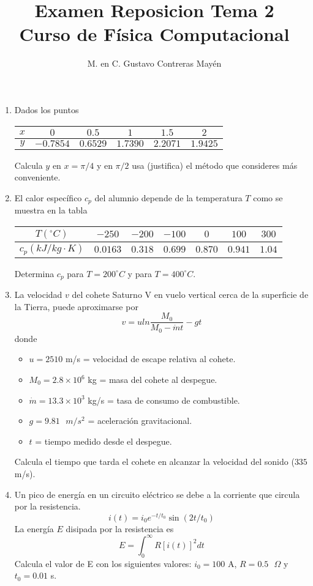 \documentclass[11pt]{article}
\title{Examen Reposicion Tema 2 \\ Curso de Física Computacional}
\author{M. en C. Gustavo Contreras May\'{e}n}
\date{ }
\begin{document}
\maketitle
\fontsize{14}{14}\selectfont
\begin{enumerate}
\item Dados los puntos
\begin{table}[H]
\centering 
\begin{large}
\begin{tabulary}{15cm}{c | c | c | c | c | c  }\normalsize
$x$ & $0$ & $0.5$ & $1$ & $1.5$ & $2$ \\
\midrule
$y$ & $-0.7854$ & $0.6529$ & $1.7390$ & $2.2071$ & $1.9425$
\end{tabulary}
\end{large}
\end{table}
Calcula $y$ en $x=\pi/4$ y en $\pi/2$ usa (justifica) el método que consideres más conveniente.
\item El calor específico $c_{p}$ del alumnio depende de la temperatura $T$ como se muestra en la tabla
\begin{table}[H]
\centering 
\begin{large}
\begin{tabulary}{15cm}{c | c | c | c | c | c | c }
$T (^{\circ}C)$ & $-250$ & $-200$ & $-100$ & $0$ & $100$ & $300$ \\
\midrule
$c_{p} (k J/kg \cdot K)$ & $0.0163$ & $0.318$ & $0.699$ & $0.870$ & $0.941$ & $1.04  $
\end{tabulary}
\end{large}	
\end{table}
Determina $c_{p}$ para $T=200^{\circ}C$ y para $T=400^{\circ}C$.
\item La velocidad $v$ del cohete Saturno V en vuelo vertical cerca de la superficie de la Tierra, puede aproximarse por
\[ v = u ln \dfrac{M_{0}}{M_{0}- \dot{m}t}- gt\]
donde
\begin{itemize}
\item $u=2510$ m/s = velocidad de escape relativa al cohete.
\item $M_{0}= 2.8 \times 10^{6}$ kg = masa del cohete al despegue.
\item $\dot{m}=13.3 \times 10^{3}$ kg/s = tasa de consumo de combustible.
\item $g=9.81 \mbox{ }m/s^{2}$ = aceleración gravitacional.
\item  $t$ = tiempo medido desde el despegue.
\end{itemize}
Calcula el tiempo que tarda el cohete en alcanzar la velocidad del sonido ($335$ m/s).
\item Un pico de energía en un circuito eléctrico se debe a la corriente que circula por la resistencia.
\[ i(t) = i_{0} e^{-t/t_{0}} \sin(2t/t_{0}) \]
La energía $E$ disipada por la resistencia es
\[ E = \int_{0}^{\infty} R [i(t)]^{2}  dt \]
Calcula el valor de E con los siguientes valores: $i_{0}=100 \mbox{ A}$, $R=0.5 \mbox{ } \Omega$ y $t_{0}=0.01$ s.
\end{enumerate}
\end{document}
